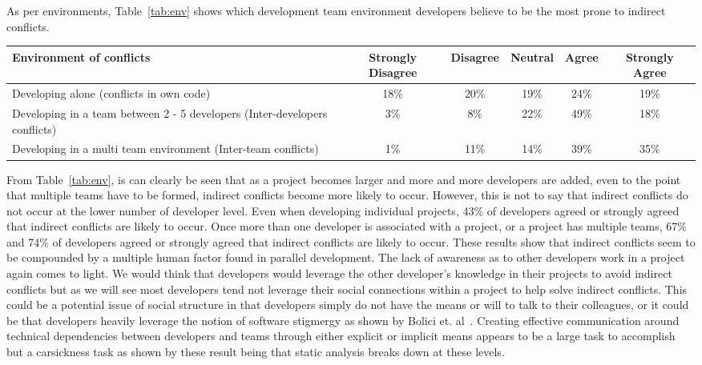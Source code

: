 \documentclass[conference]{IEEEtran}
\begin{document}
As per environments, Table~\ref{tab:env} shows which development team environment developers believe to be the most
prone to indirect conflicts.

\begin{table*}[tb!]
\begin{center}
\begin{tabular}{| p{7cm} | c | c | c | c | c |}
\hline
Environment of conflicts & Strongly Disagree & Disagree & Neutral & Agree & Strongly Agree \\
\hline
\hline
Developing alone (conflicts in own code) & 18\% & 20\% & 19\% & 24\% & 19\% \\ \hline
Developing in a team between 2 - 5 developers (Inter-developers conflicts) & 3\% & 8\% & 22\% & 49\% & 18\% \\ \hline
Developing in a multi team environment (Inter-team conflicts) & 1\% & 11\% & 14\% & 39\% & 35\% \\ \hline
\end{tabular}
\end{center}
\caption{Results of survey questions to development environments in which indirect conflicts are likely to occur, in terms of percentage
of developers surveyed.\label{tab:env}}
\end{table*}

From Table~\ref{tab:env}, is can clearly be seen that as a project becomes larger and more and more developers are added, even to the point
that multiple teams have to be formed, indirect conflicts become more likely to occur. However, this is not to say that indirect conflicts
do not occur at the lower number of developer level. Even when developing individual projects, 43\% of developers agreed or strongly agreed
that indirect conflicts are likely to occur. Once more than one developer is associated with a project, or a project has multiple teams, 
67\% and 74\% of developers agreed or strongly agreed that indirect conflicts are likely to occur. These results show that indirect conflicts
seem to be compounded by a multiple human factor found in parallel development. The lack of awareness as to other developers work in a project 
again comes to light. We would think that developers would leverage the other developer's knowledge in their projects to avoid indirect conflicts
but as we will see most developers tend not leverage their social connections within a project to help solve indirect conflicts. This could be
a potential issue of social structure in that developers simply do not have the means or will to talk to their colleagues, or it could be that
developers heavily leverage the notion of software stigmergy as shown by Bolici et. al~\cite{Bolici}. Creating effective communication around
technical dependencies between developers and teams through either explicit or implicit means appears to be a large task to accomplish but a
carsickness task as shown by these result being that static analysis breaks down at these levels.
\end{document}
